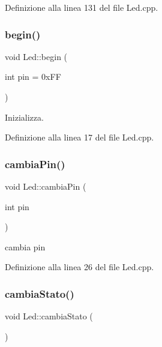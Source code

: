 Definizione alla linea 131 del file Led.\+cpp.

\mbox{\label{class_led_ad0485b411fd3309eab094f0ad252f6f7}} 
\subsubsection{\texorpdfstring{begin()}{begin()}}
{\footnotesize\ttfamily void Led\+::begin (\begin{DoxyParamCaption}\item[{int}]{pin = {\ttfamily 0xFF} }\end{DoxyParamCaption})}



Inizializza. 



Definizione alla linea 17 del file Led.\+cpp.

\mbox{\label{class_led_a38129e9ebf1bd161c46b0dd26263ba89}} 
\subsubsection{\texorpdfstring{cambia\+Pin()}{cambiaPin()}}
{\footnotesize\ttfamily void Led\+::cambia\+Pin (\begin{DoxyParamCaption}\item[{int}]{pin }\end{DoxyParamCaption})}



cambia pin 



Definizione alla linea 26 del file Led.\+cpp.

\mbox{\label{class_led_a9167b7276efcab472e1bb9cd4c1b872d}} 
\subsubsection{\texorpdfstring{cambia\+Stato()}{cambiaStato()}}
{\footnotesize\ttfamily void Led\+::cambia\+Stato (\begin{DoxyParamCaption}{ }\end{DoxyParamCaption})}



